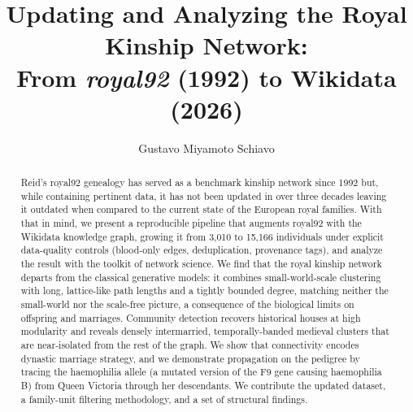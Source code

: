\renewcommand\footnotetextcopyrightpermission[1]{}
\pagestyle{plain}

\graphicspath{{../}{./}}   %



\title{Updating and Analyzing the Royal Kinship Network:\\
       From \textit{royal92} (1992) to Wikidata (2026)}

\author{Gustavo Miyamoto Schiavo}

\begin{abstract}
Reid's royal92 genealogy has served as a benchmark kinship network since
1992 but, while containing pertinent data, it has not been updated in over three decades leaving it outdated when compared to the current state of the European royal families. With that in mind, we present a reproducible
pipeline that augments royal92 with the Wikidata knowledge graph, growing
it from 3{,}010 to 15{,}166 individuals under explicit data-quality controls
(blood-only edges, deduplication, provenance tags), and analyze the result with
the toolkit of network science. We find that the royal kinship network departs
from the classical generative models: it combines small-world-scale clustering
with long, lattice-like path lengths and a tightly bounded degree, matching
neither the small-world nor the scale-free picture, a consequence of the
biological limits on offspring and marriages. Community detection recovers historical
houses at high modularity and reveals densely intermarried, temporally-banded
medieval clusters that are near-isolated from the rest of the graph. We show that
connectivity encodes dynastic marriage strategy, and we demonstrate propagation on
the pedigree by tracing the haemophilia allele (a mutated version of the F9 gene causing haemophilia B) from Queen Victoria through her
descendants. We contribute the updated dataset, a family-unit filtering
methodology, and a set of structural findings.
\end{abstract}


